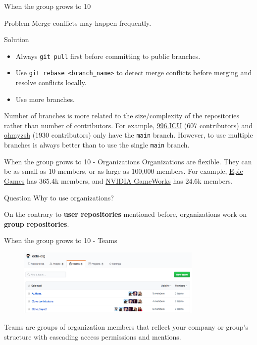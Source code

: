 \documentclass[12pt]{beamer}
\begin{document}
\begin{frame}{When the group grows to 10}
    \begin{alertblock}{Problem}
        Merge conflicts may happen frequently.
    \end{alertblock}
    \begin{block}{Solution}
    \begin{itemize}
        \item Always \texttt{git pull} first before committing to public branches.
        \item Use \texttt{git rebase <branch\_name>} to detect merge conflicts before merging and resolve conflicts locally.
        \item Use more branches.
    \end{itemize}
    \end{block}
    Number of branches is more related to the size/complexity of the repositories rather than number of contributors. For example, \href{https://github.com/996icu/996.ICU}{996.ICU} (607 contributors) and \href{https://github.com/ohmyzsh/ohmyzsh}{ohmyzsh} (1930 contributors) only have the \texttt{main} branch. However, to use multiple branches is always better than to use the single \texttt{main} branch.
\end{frame}

\begin{frame}{When the group grows to 10 - Organizations}
    Organizations are flexible. They can be as small as 10 members, or as large as 100,000 members. For example, \href{https://github.com/EpicGames}{Epic Games} has 365.4k members, and \href{https://github.com/NVIDIAGameWorks}{NVIDIA GameWorks} has 24.6k members.
    \begin{block}{Question}
        Why to use organizations?
    \end{block}
    On the contrary to \textbf{user repositories} mentioned before, organizations work on \textbf{group repositories}.%
\end{frame}

\begin{frame}{When the group grows to 10 - Teams}
    \begin{figure}[H]
        \centering
        \includegraphics[width=0.8\textwidth]{org-list-of-teams.png}
    \end{figure}
    Teams are groups of organization members that reflect your company or group's structure with cascading access permissions and mentions.
\end{frame}
\end{document}
